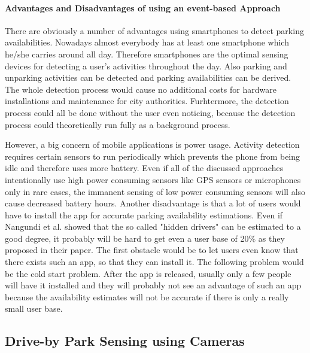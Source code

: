 \paragraph{Advantages and Disadvantages of using an event-based Approach}

There are obviously a number of advantages using smartphones to detect parking availabilities. Nowadays almost everybody has at least one smartphone which he/she carries around all day. Therefore smartphones are the optimal sensing devices for detecting a user's activities throughout the day. Also parking and unparking activities can be detected and parking availabilities can be derived. The whole detection process would cause no additional costs for hardware installations and maintenance for city authorities. Furhtermore, the detection process could all be done without the user even noticing, because the detection process could theoretically run fully as a background process. 

However, a big concern of mobile applications is power usage. Activity detection requires certain sensors to run periodically which prevents the phone from being idle and therefore uses more battery. Even if all of the discussed approaches intentionally use high power consuming sensors like GPS sensors or microphones only in rare cases, the immanent sensing of low power consuming sensors will also cause decreased battery hours. Another disadvantage is that a lot of users would have to install the app for accurate parking availability estimations. Even if Nangundi et al. \cite{Nandugudi:2014:PPP:2632048.2632098} showed that the so called "hidden drivers" can be estimated to a good degree, it probably will be hard to get even a user base of 20\% as they proposed in their paper. The first obstacle would be to let users even know that there exists such an app, so that they can install it. The following problem would be the cold start problem. After the app is released, usually only a few people will have it installed and they will probably not see an advantage of such an app because the availability estimates will not be accurate if there is only a really small user base. 






\subsection{Drive-by Park Sensing using Cameras}
\label{sec:related_driveby_park_sensing_cameras}
 
